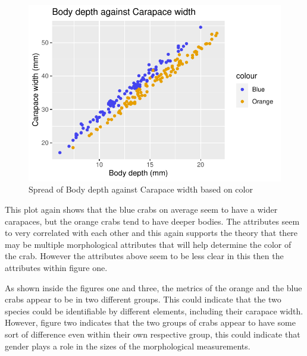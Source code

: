 \documentclass[
]{article}
\begin{document}
\newpage
\begin{figure}[H]

{\centering \includegraphics{CrabProject_files/figure-latex/figure3-1} 

}

\caption{Spread of Body depth against Carapace width based on color}\label{fig:figure3}
\end{figure}

This plot again shows that the blue crabs on average seem to have a
wider carapaces, but the orange crabs tend to have deeper bodies. The
attributes seem to very correlated with each other and this again
supports the theory that there may be multiple morphological attributes
that will help determine the color of the crab. However the attributes
above seem to be less clear in this then the attributes within figure
one.

As shown inside the figures one and three, the metrics of the orange and
the blue crabs appear to be in two different groups. This could indicate
that the two species could be identifiable by different elements,
including their carapace width. However, figure two indicates that the
two groups of crabs appear to have some sort of difference even within
their own respective group, this could indicate that gender plays a role
in the sizes of the morphological measurements.
\end{document}
